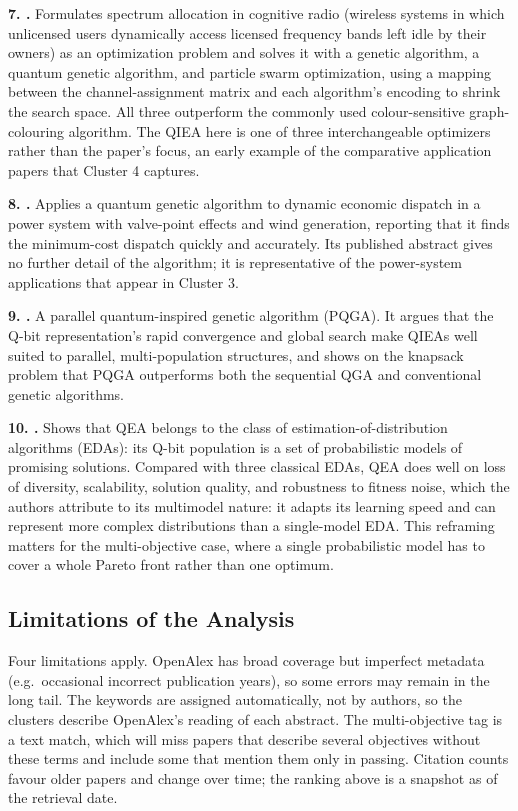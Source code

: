 \textbf{7. \citet{zhao2009cognitive}.} Formulates spectrum allocation in
cognitive radio (wireless systems in which unlicensed users
dynamically access licensed frequency bands left idle by their owners)
as an optimization problem and solves it with a
genetic algorithm, a quantum genetic algorithm, and particle swarm
optimization, using a mapping between the channel-assignment matrix and
each algorithm's encoding to shrink the search space. All three
outperform the commonly used colour-sensitive graph-colouring
algorithm. The QIEA here is one of three interchangeable optimizers
rather than the paper's focus, an early example of the comparative
application papers that Cluster 4 captures.

\textbf{8. \citet{lee2011qgadispatch}.} Applies a quantum genetic
algorithm to dynamic economic dispatch in a power system with
valve-point effects and wind generation, reporting that it finds the
minimum-cost dispatch quickly and accurately. Its published abstract gives no further detail of
the algorithm; it is representative of the power-system applications
that appear in Cluster 3.

\textbf{9. \citet{han2001pqga}.} A parallel quantum-inspired genetic
algorithm (PQGA). It argues that the Q-bit representation's rapid
convergence and global search make QIEAs well suited to parallel,
multi-population structures, and shows on the knapsack problem that
PQGA outperforms both the sequential QGA and conventional genetic
algorithms.

\textbf{10. \citet{platel2009qeaeda}.} Shows that QEA belongs to the
class of estimation-of-distribution algorithms (EDAs): its Q-bit
population is a set of probabilistic models of promising solutions.
Compared with three classical EDAs, QEA does well on loss of
diversity, scalability, solution quality, and robustness to fitness
noise, which the authors attribute to its multimodel nature: it adapts
its learning speed and can represent more complex distributions than a
single-model EDA. This reframing matters for the multi-objective case,
where a single probabilistic model has to cover a whole Pareto front
rather than one optimum.

\subsection{Limitations of the Analysis}
\label{sec:bibliometric:limitations}

Four limitations apply. OpenAlex has broad coverage but imperfect
metadata (e.g.\ occasional incorrect publication years), so some
errors may remain in the long tail. The keywords are assigned automatically, not by
authors, so the clusters describe OpenAlex's reading of each abstract.
The multi-objective tag is a text match, which will miss papers that
describe several objectives without these terms and include some that
mention them only in passing. Citation counts favour older papers and
change over time; the ranking above is a snapshot as of the retrieval
date.
